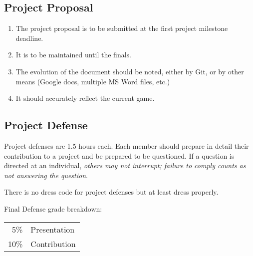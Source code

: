 \documentclass[10pt]{article}
\begin{document}
\subsection{Project Proposal}
\begin{enumerate}[noitemsep]
\item The project proposal is to be submitted at the first project milestone deadline.
\item It is to be maintained until the finals.
\item The evolution of the document should be noted, either by Git, or by other means (Google docs, multiple MS Word files, etc.)
\item It should accurately reflect the current game.
\end{enumerate}

\subsection{Project Defense}
Project defenses are 1.5 hours each. Each member should prepare in detail their contribution to a project and be prepared to be questioned. If a question is directed at an individual, \emph{others may not interrupt; failure to comply counts as not answering the question}. 

There is no dress code for project defenses but at least dress properly.

Final Defense grade breakdown:
\begin{center}
\begin{tabular}{rl}
5\% & Presentation\\
10\% & Contribution\\
\end{tabular}
\end{center}
\end{document}
